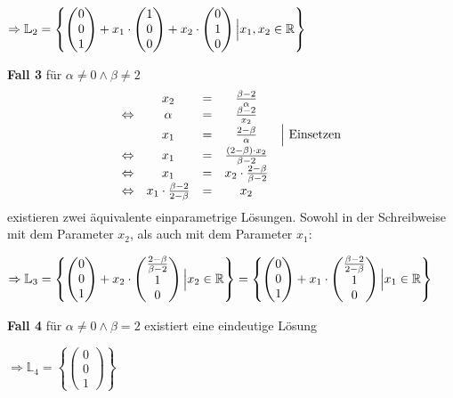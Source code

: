 $\displaystyle \Rightarrow \mathbb{L}_{2} =\left\{\begin{pmatrix}
	0\\
	0\\
	1
\end{pmatrix} +x_{1} \cdot \begin{pmatrix}
	1\\
	0\\
	0
\end{pmatrix} +x_{2} \cdot \begin{pmatrix}
	0\\
	1\\
	0
\end{pmatrix}\Bigl| x_{1} ,x_{2} \in \mathbb{R}\right\}$



\textbf{Fall 3} für $\displaystyle \alpha \neq 0\land \beta \neq 2$ 
\begin{equation*}
	\begin{array}{ c c c c c }
		& x_{2} & = & \frac{\beta -2}{\alpha } & \\
		\Leftrightarrow  & \alpha  & = & \frac{\beta -2}{x_{2}} & \\
		& x_{1} & = & \frac{2-\beta }{\alpha } & \Bigl|\text{ Einsetzen}\\
		\Leftrightarrow  & x_{1} & = & \frac{( 2-\beta ) \cdot x_{2}}{\beta -2} & \\
		\Leftrightarrow  & x_{1} & = & x_{2} \cdot \frac{2-\beta }{\beta -2} & \\
		\Leftrightarrow  & x_{1} \cdot \frac{\beta -2}{2-\beta } & = & x_{2} &
	\end{array}
\end{equation*}
existieren zwei äquivalente einparametrige Lösungen. Sowohl in der Schreibweise mit dem Parameter $\displaystyle x_{2}$, als auch mit dem Parameter $\displaystyle x_{1}$:

$\displaystyle \Rightarrow \mathbb{L}_{3} =\left\{\begin{pmatrix}
	0\\
	0\\
	1
\end{pmatrix} +x_{2} \cdot \begin{pmatrix}
	\frac{2-\beta }{\beta -2}\\
	1\\
	0
\end{pmatrix}\Bigl| x_{2} \in \mathbb{R}\right\} =\left\{\begin{pmatrix}
	0\\
	0\\
	1
\end{pmatrix} +x_{1} \cdot \begin{pmatrix}
	\frac{\beta -2}{2-\beta }\\
	1\\
	0
\end{pmatrix}\Bigl| x_{1} \in \mathbb{R}\right\}$



\textbf{Fall 4} für $\displaystyle \alpha \neq 0\land \beta =2$ existiert eine eindeutige Lösung



$\displaystyle \Rightarrow \mathbb{L}_{4} =\left\{\begin{pmatrix}
	0\\
	0\\
	1
\end{pmatrix}\right\}$